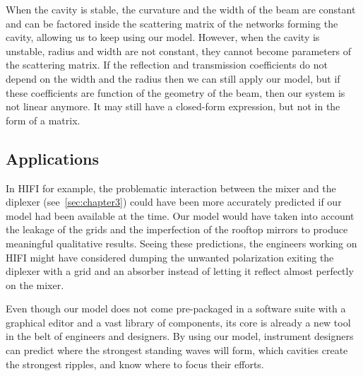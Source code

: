 When the cavity is stable, the curvature and the width of the beam are constant and can be factored inside the scattering matrix of the networks forming the cavity, allowing us to keep using our model.
However, when the cavity is unstable, radius and width are not constant, they cannot become parameters of the scattering matrix.
If the reflection and transmission coefficients do not depend on the width and the radius then we can still apply our model, but if these coefficients are function of the geometry of the beam, then our system is not linear anymore.
It may still have a closed-form expression, but not in the form of a matrix.




\subsection{Applications}
In HIFI for example, the problematic interaction between the mixer and the diplexer (see~\cref{sec:chapter3}) could have been more accurately predicted if our model had been available at the time.
Our model would have taken into account the leakage of the grids and the imperfection of the rooftop mirrors to produce meaningful qualitative results.
Seeing these predictions, the engineers working on HIFI might have considered dumping the unwanted polarization exiting the diplexer with a grid and an absorber instead of letting it reflect almost perfectly on the mixer.

Even though our model does not come pre-packaged in a software suite with a graphical editor and a vast library of components, its core is already a new tool in the belt of engineers and designers.
By using our model, instrument designers can predict where the strongest standing waves will form, which cavities create the strongest ripples, and know where to focus their efforts.
